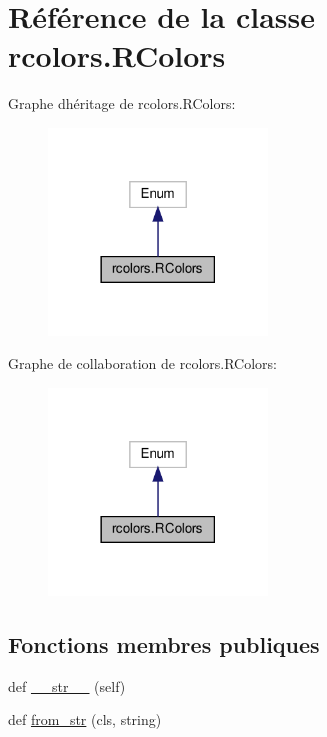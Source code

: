 \hypertarget{classrcolors_1_1RColors}{}\section{Référence de la classe rcolors.\+R\+Colors}
\label{classrcolors_1_1RColors}


Graphe d\textquotesingle{}héritage de rcolors.\+R\+Colors\+:\nopagebreak
\begin{figure}[H]
\begin{center}
\leavevmode
\includegraphics[width=165pt]{classrcolors_1_1RColors__inherit__graph}
\end{center}
\end{figure}


Graphe de collaboration de rcolors.\+R\+Colors\+:\nopagebreak
\begin{figure}[H]
\begin{center}
\leavevmode
\includegraphics[width=165pt]{classrcolors_1_1RColors__coll__graph}
\end{center}
\end{figure}
\subsection*{Fonctions membres publiques}
\begin{DoxyCompactItemize}
\item 
def \hyperlink{classrcolors_1_1RColors_ab8014c6c1a797ab32c7aa78633efb708}{\+\_\+\+\_\+str\+\_\+\+\_\+} (self)
\item 
def \hyperlink{classrcolors_1_1RColors_a05522a9a34974e215921dc130cba1ded}{from\+\_\+str} (cls, string)
\end{DoxyCompactItemize}
